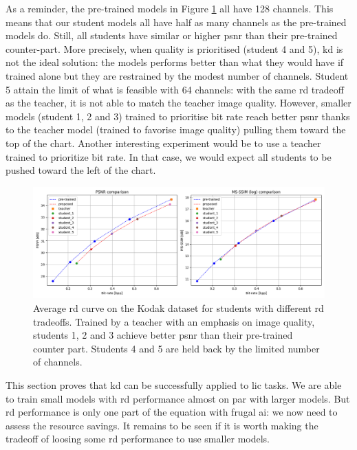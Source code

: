 As a reminder, the pre-trained models in Figure \ref{kd_lic_4} all have 128 channels. This means that our student models all have half as many channels as the pre-trained models do. Still, all students have similar or higher \acrshort{psnr} than their pre-trained counter-part. More precisely, when quality is prioritised (student 4 and 5), \acrshort{kd} is not the ideal solution: the models performs better than what they would have if trained alone but they are restrained by the modest number of channels. Student 5 attain the limit of what is feasible with 64 channels: with the same \acrshort{rd} tradeoff as the teacher, it is not able to match the teacher image quality. However, smaller models (student 1, 2 and 3) trained to prioritise bit rate reach better \acrshort{psnr} thanks to the teacher model (trained to favorise image quality) pulling them toward the top of the chart. Another interesting experiment would be to use a teacher trained to prioritize bit rate. In that case, we would expect all students to be pushed toward the left of the chart. %

\begin{figure}
    \centering
    \includegraphics[width=15cm]{img/kd_lic_rd_lambda_1.png}
    \caption[Average \acrshort{rd} curve on the Kodak dataset for students with different \acrshort{rd} tradeoffs.]{Average \acrshort{rd} curve on the Kodak dataset for students with different \acrshort{rd} tradeoffs. Trained by a teacher with an emphasis on image quality, students 1, 2 and 3 achieve better \acrshort{psnr} than their pre-trained counter part. Students 4 and 5 are held back by the limited number of channels.}
    \label{kd_lic_4}
\end{figure}

This section proves that \acrshort{kd} can be successfully applied to \acrshort{lic} tasks. We are able to train small models with \acrshort{rd} performance almost on par with larger models. But \acrshort{rd} performance is only one part of the equation with frugal \acrshort{ai}: we now need to assess the resource savings. It remains to be seen if it is worth making the tradeoff of loosing some \acrshort{rd} performance to use smaller models.

